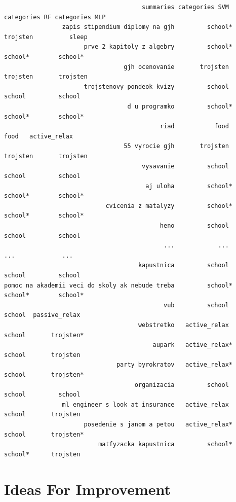 \documentclass[a4paper, 12pt]{article}
\begin{document}
\begin{small}
\begin{verbatim}
                                      summaries categories SVM  categories RF categories MLP
                zapis stipendium diplomy na gjh         school*      trojsten          sleep
                      prve 2 kapitoly z algebry         school*        school*        school*
                                 gjh ocenovanie       trojsten       trojsten       trojsten
                      trojstenovy pondeok kvizy         school         school         school
                                  d u programko         school*        school*        school*
                                           riad           food           food   active_relax
                                 55 vyrocie gjh       trojsten       trojsten       trojsten
                                      vysavanie         school         school         school
                                       aj uloha         school*        school*        school*
                            cvicenia z matalyzy         school*        school*        school*
                                           heno         school         school         school
                                            ...            ...           ...             ...
                                     kapustnica         school         school         school
pomoc na akademii veci do skoly ak nebude treba         school*        school*        school*
                                            vub         school         school  passive_relax
                                     webstretko   active_relax         school       trojsten*
                                         aupark   active_relax*        school       trojsten
                               party byrokratov   active_relax*        school       trojsten*
                                    organizacia         school         school         school
                ml engineer s look at insurance   active_relax         school       trojsten
                      posedenie s janom a petou   active_relax*        school       trojsten*
                          matfyzacka kapustnica         school*        school*      trojsten
\end{verbatim}
\end{small}

\section{Ideas For Improvement}
\end{document}
